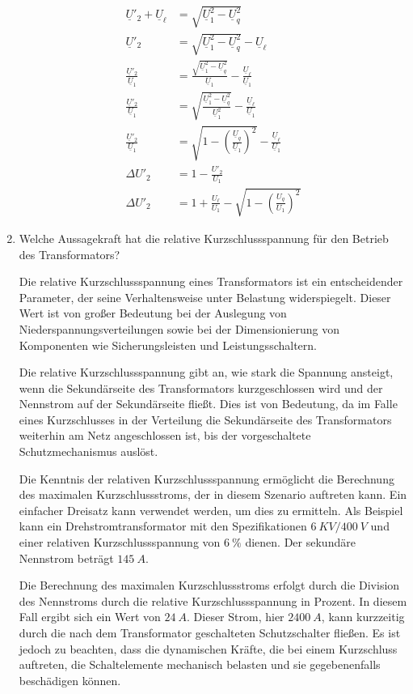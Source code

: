 \begin{enumerate}[label=\alph*)]
\begin{align*}
      \underline U'_2+\underline U_\ell &= \sqrt{\underline U_1^2-\underline U_q^2}\\
      \underline U'_2 &= \sqrt{\underline U_1^2-\underline U_q^2}-\underline U_\ell\\
      \frac{\underline U'_2}{\underline U_1} &= \frac{\sqrt{\underline U_1^2-\underline U_q^2}}{\underline U_1}-\displaystyle\frac{\underline U_\ell}{\underline U_1}\\
      \frac{\underline U'_2}{\underline U_1} &= {\sqrt{\frac{\underline U_1^2-\underline U_q^2}{\underline U_1^2}}}
      -\displaystyle\frac{\underline U_\ell}{\underline U_1}\\
      \frac{\underline U'_2}{\underline U_1} &= {\sqrt{1-\left(\frac{\underline U_q}{\underline U_1}\right)^2}}
      -\displaystyle\frac{\underline U_\ell}{\underline U_1}\\
      \Delta U'_2 &= 1-\frac{U'_2}{U_1}\\ 
      \Delta U'_2 &= 1 + \frac{U_\ell}{U_1}- \sqrt{1-\left(\frac{U_q}{U_1}\right)^2}
    \end{align*}
  \item Welche Aussagekraft hat die relative Kurzschlussspannung für den Betrieb des Transformators? 
  
  Die relative Kurzschlussspannung eines Transformators ist ein entscheidender Parameter, der seine Verhaltensweise unter Belastung widerspiegelt. Dieser Wert ist von großer Bedeutung bei der Auslegung von Niederspannungsverteilungen sowie bei der Dimensionierung von Komponenten wie Sicherungsleisten und Leistungsschaltern.
  
  Die relative Kurzschlussspannung gibt an, wie stark die Spannung ansteigt, wenn die Sekundärseite des Transformators kurzgeschlossen wird und der Nennstrom auf der Sekundärseite fließt. Dies ist von Bedeutung, da im Falle eines Kurzschlusses in der Verteilung die Sekundärseite des Transformators weiterhin am Netz angeschlossen ist, bis der vorgeschaltete Schutzmechanismus auslöst.
  
  Die Kenntnis der relativen Kurzschlussspannung ermöglicht die Berechnung des maximalen Kurzschlussstroms, der in diesem Szenario auftreten kann. Ein einfacher Dreisatz kann verwendet werden, um dies zu ermitteln. Als Beispiel kann ein Drehstromtransformator mit den Spezifikationen $6\ KV / 400\ V$ und einer relativen Kurzschlussspannung von $6\ \%$ dienen. Der sekundäre Nennstrom beträgt $145\ A$.
  
  Die Berechnung des maximalen Kurzschlussstroms erfolgt durch die Division des Nennstroms durch die relative Kurzschlussspannung in Prozent. In diesem Fall ergibt sich ein Wert von $24\ A$. Dieser Strom, hier $2400\ A$, kann kurzzeitig durch die nach dem Transformator geschalteten Schutzschalter fließen. Es ist jedoch zu beachten, dass die dynamischen Kräfte, die bei einem Kurzschluss auftreten, die Schaltelemente mechanisch belasten und sie gegebenenfalls beschädigen können.
  

\end{enumerate}
